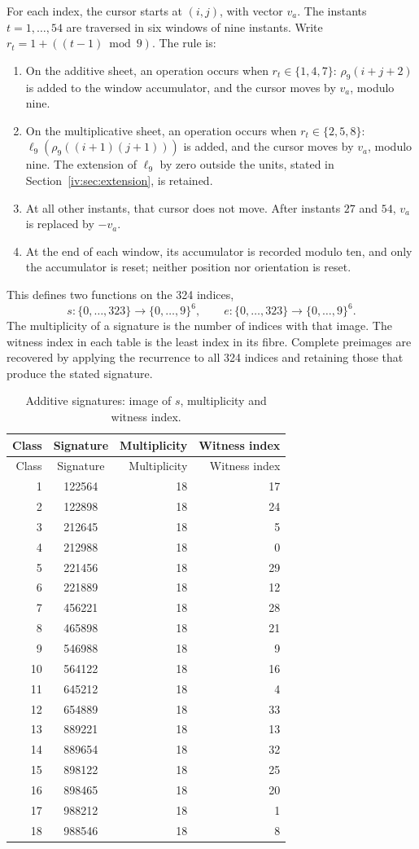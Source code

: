 For each index, the cursor starts at \((i,j)\), with vector \(v_a\).
The instants \(t=1,\ldots,54\) are traversed in six windows
of nine instants. Write \(r_t=1+((t-1)\bmod9)\). The rule is:
\begin{enumerate}
\item On the additive sheet, an operation occurs when \(r_t\in\{1,4,7\}\):
\(\rho_9(i+j+2)\) is added to the window accumulator, and the
cursor moves by \(v_a\), modulo nine.
\item On the multiplicative sheet, an operation occurs when \(r_t\in\{2,5,8\}\):
\(\ell_9(\rho_9((i+1)(j+1)))\) is added, and the cursor moves
by \(v_a\), modulo nine. The extension of \(\ell_9\) by zero
outside the units, stated in Section~\ref{iv:sec:extension}, is retained.
\item At all other instants, that cursor does not move. After
instants \(27\) and \(54\), \(v_a\) is replaced by \(-v_a\).
\item At the end of each window, its accumulator is recorded modulo ten,
and only the accumulator is reset; neither position nor orientation is reset.
\end{enumerate}
This defines two functions on the 324 indices,
\[
 s:\{0,\ldots,323\}\longrightarrow\{0,\ldots,9\}^6,\qquad
 e:\{0,\ldots,323\}\longrightarrow\{0,\ldots,9\}^6.
\]
The multiplicity of a signature is the number of indices with that image.
The witness index in each table is the least index in its fibre.
Complete preimages are recovered by applying the recurrence to all
324 indices and retaining those that produce the stated signature.

\begin{longtable}{rcrr}
\caption{Additive signatures: image of \(s\), multiplicity and witness index.}
\label{iv:iv:tabla-firmas-aditivas}\\
\toprule
Class & Signature & Multiplicity & Witness index\\
\midrule
\endfirsthead
\toprule
Class & Signature & Multiplicity & Witness index\\
\midrule
\endhead
1&122564&18&17\\
2&122898&18&24\\
3&212645&18&5\\
4&212988&18&0\\
5&221456&18&29\\
6&221889&18&12\\
7&456221&18&28\\
8&465898&18&21\\
9&546988&18&9\\
10&564122&18&16\\
11&645212&18&4\\
12&654889&18&33\\
13&889221&18&13\\
14&889654&18&32\\
15&898122&18&25\\
16&898465&18&20\\
17&988212&18&1\\
18&988546&18&8\\
\bottomrule
\end{longtable}

